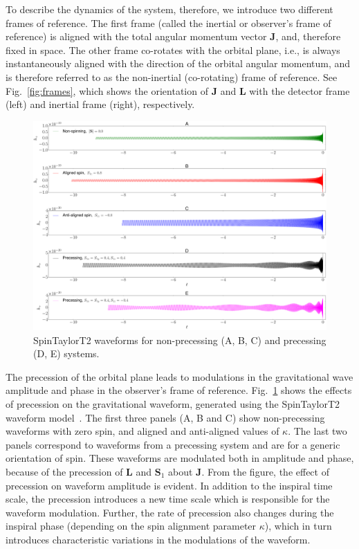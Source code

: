 To describe the dynamics of the system, therefore, we introduce two different
frames of reference. The first frame (called the inertial or observer's frame
of reference) is aligned with the total angular momentum vector $\mathbf{J}$,
and, therefore fixed in space. The other frame co-rotates with the orbital
plane, i.e., is always instantaneously aligned with the direction of the
orbital angular momentum, and is therefore referred to as the non-inertial
(co-rotating) frame of reference. See Fig.~\ref{fig:frames}, which shows the
orientation of $\mathbf{J}$ and $\mathbf{L}$ with the detector frame (left)
and inertial frame (right), respectively. 


\begin{figure}[t]
\includegraphics[width=\textwidth]{./images/SPT2_waveforms.pdf}
\caption{SpinTaylorT2 waveforms for non-precessing (A, B, C) and precessing
(D, E) systems.}
\centering 
\label{fig:waveforms} 
\end{figure}

The precession of the orbital plane leads to modulations in the gravitational
wave amplitude and phase in the observer's frame of reference.
Fig.~\ref{fig:waveforms} shows the effects of precession on the gravitational
waveform, generated using the SpinTaylorT2 waveform model~\cite{STT2}. The
first three panels (A, B and C) show non-precessing waveforms with zero spin,
and aligned and anti-aligned values of $\kappa$. The last two panels
correspond to waveforms from a precessing system and are for a generic
orientation of spin. These waveforms are modulated both in amplitude and
phase, because of the precession of $\mathbf{L}$ and $\mathbf{S}_1$ about
$\mathbf{J}$. From the figure, the effect of precession on waveform amplitude
is evident. In addition to the inspiral time scale, the precession introduces
a new time scale which is responsible for the waveform modulation. Further,
the rate of precession also changes during the inspiral phase (depending on
the spin alignment parameter $\kappa$), which in turn introduces
characteristic variations in the modulations of the waveform.


